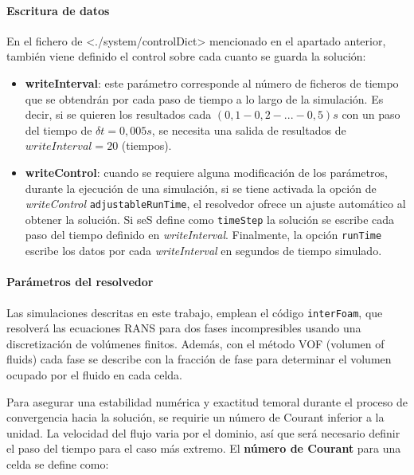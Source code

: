 \paragraph{Escritura de datos}\label{header-n297}

En el fichero de \textless{}./system/controlDict\textgreater{}
mencionado en el apartado anterior, también viene definido el control
sobre cada cuanto se guarda la solución:

\begin{itemize}
\item
  \textbf{writeInterval}: este parámetro corresponde al número de
  ficheros de tiempo que se obtendrán por cada paso de tiempo a lo largo
  de la simulación. Es decir, si se quieren los resultados cada
  \((0,1-0,2-...-0,5)s\) con un paso del tiempo de \(\delta t=0,005s\),
  se necesita una salida de resultados de \(writeInterval=20\)
  (tiempos).
\item
  \textbf{writeControl}: cuando se requiere alguna modificación de los
  parámetros, durante la ejecución de una simulación, si se tiene
  activada la opción de \emph{writeControl} \texttt{adjustableRunTime},
  el resolvedor ofrece un ajuste automático al obtener la solución. Si
  seS define como \texttt{timeStep} la solución se escribe cada paso del
  tiempo definido en \emph{writeInterval}. Finalmente, la opción
  \texttt{runTime} escribe los datos por cada \emph{writeInterval} en
  segundos de tiempo simulado.
\end{itemize}

\paragraph{Parámetros del resolvedor}\label{header-n308}

Las simulaciones descritas en este trabajo, emplean el código
\texttt{interFoam}, que resolverá las ecuaciones RANS para dos fases
incompresibles usando una discretización de volúmenes finitos. Además,
con el método VOF (volumen of fluids) cada fase se describe con la
fracción de fase para determinar el volumen ocupado por el fluido en
cada celda.

Para asegurar una estabilidad numérica y exactitud temoral durante el
proceso de convergencia hacia la solución, se requirie un número de
Courant inferior a la unidad. La velocidad del flujo varia por el
dominio, así que será necesario definir el paso del tiempo para el caso
más extremo. El \textbf{número de Courant} para una celda se define
como:

